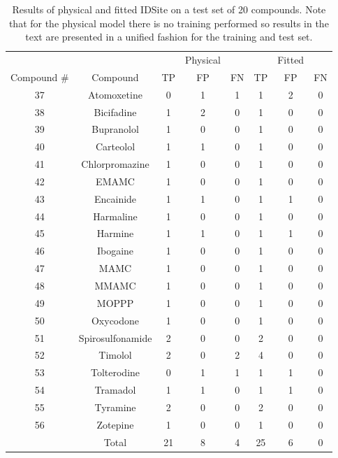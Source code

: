 \begin{table}[h]
\singlespace
\footnotesize
\centering
\begin{tabular}{cccccccc}
\hline
 &  &  & Physical &  &  & Fitted & \\
Compound \# & Compound & TP & FP & FN & TP & FP & FN \\
\hline
37 & Atomoxetine & 0 & 1 & 1 & 1 & 2 & 0 \\
38 & Bicifadine & 1 & 2 & 0 & 1 & 0 & 0 \\
39 & Bupranolol & 1 & 0 & 0 & 1 & 0 & 0 \\
40 & Carteolol & 1 & 1 & 0 & 1 & 0 & 0 \\
41 & Chlorpromazine & 1 & 0 & 0 & 1 & 0 & 0 \\
42 & EMAMC & 1 & 0 & 0 & 1 & 0 & 0 \\
43 & Encainide & 1 & 1 & 0 & 1 & 1 & 0 \\
44 & Harmaline & 1 & 0 & 0 & 1 & 0 & 0 \\
45 & Harmine & 1 & 1 & 0 & 1 & 1 & 0 \\
46 & Ibogaine & 1 & 0 & 0 & 1 & 0 & 0 \\
47 & MAMC & 1 & 0 & 0 & 1 & 0 & 0 \\
48 & MMAMC & 1 & 0 & 0 & 1 & 0 & 0 \\
49 & MOPPP & 1 & 0 & 0 & 1 & 0 & 0 \\
50 & Oxycodone & 1 & 0 & 0 & 1 & 0 & 0 \\
51 & Spirosulfonamide & 2 & 0 & 0 & 2 & 0 & 0 \\
52 & Timolol & 2 & 0 & 2 & 4 & 0 & 0 \\
53 & Tolterodine & 0 & 1 & 1 & 1 & 1 & 0 \\
54 & Tramadol & 1 & 1 & 0 & 1 & 1 & 0 \\
55 & Tyramine & 2 & 0 & 0 & 2 & 0 & 0 \\
56 & Zotepine & 1 & 0 & 0 & 1 & 0 & 0 \\
 & Total & 21 & 8 & 4 & 25 & 6 & 0 \\
\hline
\end{tabular}
\caption{Results of physical and fitted IDSite on a test set of 20 compounds.
Note that for the physical model there is no training performed so results in the text are presented in a unified fashion for the training and test set.}
\label{table:p450_testing}
\end{table}





